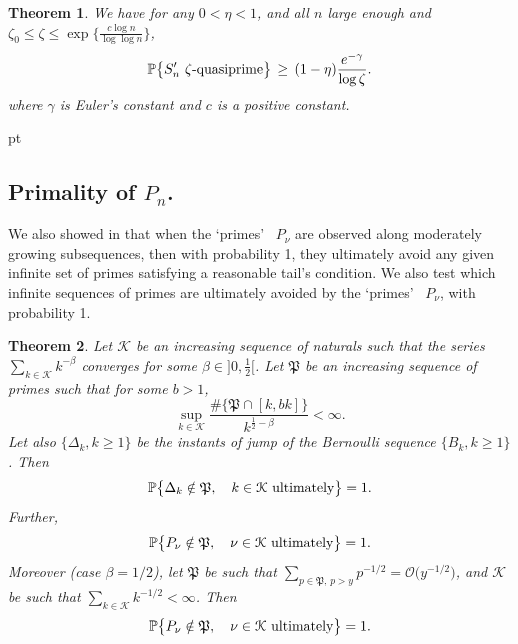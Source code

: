 \documentclass[11pt,draft,reqno]{amsart}
\newtheorem{theorem}{Theorem}[section]
\theoremstyle{definition}
\theoremstyle{remarks}
\numberwithin{equation}{section}
\def \b{{\beta}}
\def \D{{\Delta}}
\def\P{{\mathcal P}}
\def\P{{\mathbb P}}
\begin{document}
 \begin{theorem}\label{cramer.quasi.prime.P}
 We have for any $0<\eta<1$, and all $n$ large enough  and      $ \zeta_0\le  \zeta\le \exp\big\{ \frac{c\log n}{\log\log n}\big\}$, 
\begin{eqnarray*}  \P\big\{  S'_n\hbox{\ $\zeta$-quasiprime}\big\}   \,\ge  \, (1-\eta)   \frac{ e^{-\gamma} }{  \log
\zeta }. \end{eqnarray*}
 where $\gamma$ is  Euler's constant and $c$ is a positive constant.\end{theorem} 

 pt  
 \subsection{Primality of ${P_n}$.} 
We also showed in \cite{W8} that when the \lq primes\rq~  $ P_\nu$   are observed   along    moderately growing subsequences,  then with probability 1, they  ultimately avoid       any given infinite set of primes satisfying a reasonable  tail's  condition.  We also test which infinite sequences of primes  are ultimately avoided  by   the \lq primes\rq~  $ P_\nu$, with probability 1. 

\begin{theorem}\label{mathfrak}  Let $\mathcal K$ be an increasing sequence of naturals such that  
the series  $\sum_{k\in \mathcal K}  k^{-\b} $ converges for some   $\b\in ]0, \frac12[$.
Let $\mathfrak P$  be an increasing sequence of primes such that for some  $b>1$,
 $$\sup_{k\in\mathcal K} \frac{\#\{\mathfrak P\cap [k,  b k] \}}{  k^{\frac12-\b}}<\infty. $$
Let also  $\{\D_k,k\ge 1\}$ be the instants of jump of the Bernoulli sequence $ \{B_k,k\ge 1\}$.
Then \begin{eqnarray*}
   \P\big\{   \D_k\notin\mathfrak P, \quad k\in \mathcal K\ \hbox{ultimately}\big\}=1.
    \end{eqnarray*}
Further, 
\begin{eqnarray*}
   \P\big\{   P_\nu\notin\mathfrak P, \quad \nu\in \mathcal K\ \hbox{ultimately}\big\}=1.
    \end{eqnarray*}
Moreover (case $\b=1/2$), let  $\mathfrak P$ be such that 
$\sum_{p\in \mathfrak P , \, p>y} p^{-1/2} = \mathcal O \big(y^{-1/2}\big)$, and $\mathcal K$ be   such that
  $\sum_{k\in \mathcal K}  k^{-1/2}<\infty$.
Then 
\begin{eqnarray*}
   \P\big\{   P_\nu\notin\mathfrak P, \quad \nu\in \mathcal K\ \hbox{ultimately}\big\}=1.
    \end{eqnarray*}
    \end{theorem} 
\end{document}
